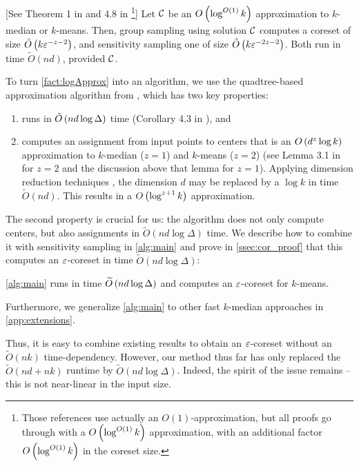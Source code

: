 \begin{fact}\label{fact:logApprox}[See Theorem 1 in \cite{stoc21} and 4.8 in \cite{FeldmanL11}\footnote{Those references use actually an $O(1)$-approximation,
    but all proofs go through with a  $O\left( \log^{O(1)} k\right)$ approximation, with an additional factor  $O\left( \log^{O(1)} k\right)$ in the coreset size.}]
    Let $\mathcal C$ be an $O\left( \log^{O(1)} k\right)$ approximation to $k$-median or $k$-means.  Then, group sampling using solution $\mathcal C$ computes a coreset of
    size $\tilde O\left( k \varepsilon^{-z-2}\right)$, and sensitivity sampling one of size $\tilde O\left( k \varepsilon^{-2z-2}\right)$.  Both run in time $\tilde O(nd)$,
    provided $\mathcal C$.  \end{fact}

To turn \cref{fact:logApprox} into an algorithm, we use the quadtree-based \fkmeans approximation algorithm from \cite{cohen2020fast}, which has two key
properties: 
\begin{enumerate}
\item \fkmeans runs in $\tilde O\left( n d \log \Delta\right)$ time (Corollary 4.3 in \cite{cohen2020fast}), and
\item \fkmeans computes an assignment from input points to centers that is an $O\left( d^z \log k\right)$ approximation to $k$-median ($z=1$) and $k$-means ($z=2$)
    (see Lemma 3.1 in \cite{cohen2020fast} for $z=2$ and the discussion above that lemma for $z=1$). Applying dimension reduction techniques \cite{MakarychevMR19}, the dimension
    $d$ may be replaced by a $\log k$ in time $\tilde O(nd)$. This results in a $O\left(\log^{z+1} k\right)$ approximation. 
\end{enumerate}

The second property is crucial for us: the algorithm does not only compute centers, but also assignments in $\tilde{O}(nd\log \Delta)$ time.  We describe how to
combine it with sensitivity sampling in \cref{alg:main} and prove in \cref{ssec:cor_proof} that this computes an $\varepsilon$-coreset in time $\tilde O(nd \log
\Delta)$:

\begin{corollary}\label{cor:mainAlg}
\cref{alg:main} runs in time $\widetilde O\left( n d \log \Delta\right)$ and computes an $\varepsilon$-coreset for $k$-means.
\end{corollary}
Furthermore, we generalize \cref{alg:main} to other fast $k$-median approaches in \cref{app:extensions}.

Thus, it is easy to combine existing results to obtain an $\varepsilon$-coreset without an $\widetilde{O}(nk)$ time-dependency.  However, our method thus far has only
replaced the $\widetilde{O}(nd + nk)$ runtime by $\widetilde{O}(nd \log \Delta)$. Indeed, the spirit of the issue remains -- this is not near-linear in the input size.

